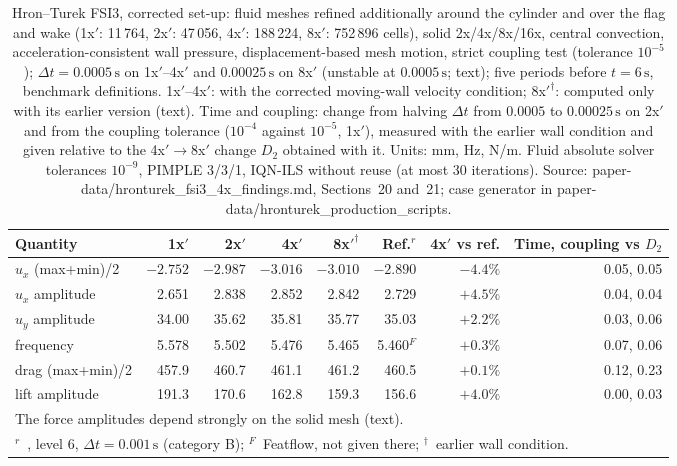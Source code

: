 \begin{table}[htbp]
	\centering
	\small
	\setlength{\tabcolsep}{3pt}
	\caption{Hron--Turek FSI3, corrected set-up: fluid meshes refined additionally around the cylinder and over the flag and wake (1x$'$: 11\,764, 2x$'$: 47\,056, 4x$'$: 188\,224, 8x$'$: 752\,896 cells), solid 2x/4x/8x/16x, central convection, acceleration-consistent wall pressure, displacement-based mesh motion, strict coupling test (tolerance $10^{-5}$); $\Delta t = 0.0005\,\mathrm{s}$ on 1x$'$--4x$'$ and $0.00025\,\mathrm{s}$ on 8x$'$ (unstable at $0.0005\,\mathrm{s}$; text); five periods before $t = 6\,\mathrm{s}$, benchmark definitions. 1x$'$--4x$'$: with the corrected moving-wall velocity condition; 8x$'^\dagger$: computed only with its earlier version (text). Time and coupling: change from halving $\Delta t$ from $0.0005$ to $0.00025\,\mathrm{s}$ on 2x$'$ and from the coupling tolerance ($10^{-4}$ against $10^{-5}$, 1x$'$), measured with the earlier wall condition and given relative to the 4x$'\to$8x$'$ change $D_2$ obtained with it. Units: mm, Hz, N/m. Fluid absolute solver tolerances $10^{-9}$, PIMPLE 3/3/1, IQN-ILS without reuse (at most 30 iterations). Source: paper-data/hronturek\_fsi3\_4x\_findings.md, Sections~20 and~21; case generator in paper-data/hronturek\_production\_scripts.}
	\label{tab:hronturek_corrected}
	\begin{tabular}{lrrrrrrr}
		\toprule
		Quantity & 1x$'$ & 2x$'$ & 4x$'$ & 8x$'^\dagger$ & Ref.$^r$ & 4x$'$ vs ref. & Time, coupling vs $D_2$ \\
		\midrule
		$u_x$ (max+min)/2 & $-2.752$ & $-2.987$ & $-3.016$ & $-3.010$ & $-2.890$ & $-4.4\%$ & 0.05, 0.05 \\
		$u_x$ amplitude & 2.651 & 2.838 & 2.852 & 2.842 & 2.729 & $+4.5\%$ & 0.04, 0.04 \\
		$u_y$ amplitude & 34.00 & 35.62 & 35.81 & 35.77 & 35.03 & $+2.2\%$ & 0.03, 0.06 \\
		frequency & 5.578 & 5.502 & 5.476 & 5.465 & 5.460$^F$ & $+0.3\%$ & 0.07, 0.06 \\
		drag (max+min)/2 & 457.9 & 460.7 & 461.1 & 461.2 & 460.5 & $+0.1\%$ & 0.12, 0.23 \\
		lift amplitude & 191.3 & 170.6 & 162.8 & 159.3 & 156.6 & $+4.0\%$ & 0.00, 0.03 \\
		\bottomrule
		\multicolumn{8}{l}{\footnotesize The force amplitudes depend strongly on the solid mesh (text).} \\
		\multicolumn{8}{l}{\footnotesize $^r$~\citet{Failer2020}, level 6, $\Delta t = 0.001\,\mathrm{s}$ (category B); $^F$~Featflow, not given there; $^\dagger$~earlier wall condition.}
	\end{tabular}
\end{table}

